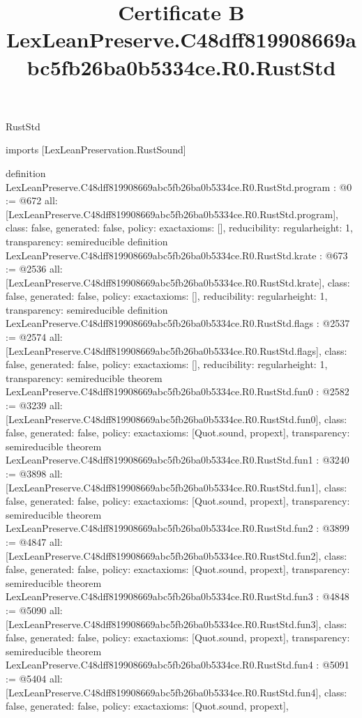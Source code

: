 \begin{lexlean}{RustStd}
\title{Certificate B LexLeanPreserve.C48dff819908669abc5fb26ba0b5334ce.R0.RustStd}
\begin{coremodule}
imports [LexLeanPreservation.RustSound]

definition LexLeanPreserve.C48dff819908669abc5fb26ba0b5334ce.R0.RustStd.program : @0 := @672 {
  all: [LexLeanPreserve.C48dff819908669abc5fb26ba0b5334ce.R0.RustStd.program],
  class: false,
  generated: false,
  policy: exact{axioms: []},
  reducibility: regular{height: 1},
  transparency: semireducible
}
definition LexLeanPreserve.C48dff819908669abc5fb26ba0b5334ce.R0.RustStd.krate : @673 := @2536 {
  all: [LexLeanPreserve.C48dff819908669abc5fb26ba0b5334ce.R0.RustStd.krate],
  class: false,
  generated: false,
  policy: exact{axioms: []},
  reducibility: regular{height: 1},
  transparency: semireducible
}
definition LexLeanPreserve.C48dff819908669abc5fb26ba0b5334ce.R0.RustStd.flags : @2537 := @2574 {
  all: [LexLeanPreserve.C48dff819908669abc5fb26ba0b5334ce.R0.RustStd.flags],
  class: false,
  generated: false,
  policy: exact{axioms: []},
  reducibility: regular{height: 1},
  transparency: semireducible
}
theorem LexLeanPreserve.C48dff819908669abc5fb26ba0b5334ce.R0.RustStd.fun0 : @2582 := @3239 {
  all: [LexLeanPreserve.C48dff819908669abc5fb26ba0b5334ce.R0.RustStd.fun0],
  class: false,
  generated: false,
  policy: exact{axioms: [Quot.sound, propext]},
  transparency: semireducible
}
theorem LexLeanPreserve.C48dff819908669abc5fb26ba0b5334ce.R0.RustStd.fun1 : @3240 := @3898 {
  all: [LexLeanPreserve.C48dff819908669abc5fb26ba0b5334ce.R0.RustStd.fun1],
  class: false,
  generated: false,
  policy: exact{axioms: [Quot.sound, propext]},
  transparency: semireducible
}
theorem LexLeanPreserve.C48dff819908669abc5fb26ba0b5334ce.R0.RustStd.fun2 : @3899 := @4847 {
  all: [LexLeanPreserve.C48dff819908669abc5fb26ba0b5334ce.R0.RustStd.fun2],
  class: false,
  generated: false,
  policy: exact{axioms: [Quot.sound, propext]},
  transparency: semireducible
}
theorem LexLeanPreserve.C48dff819908669abc5fb26ba0b5334ce.R0.RustStd.fun3 : @4848 := @5090 {
  all: [LexLeanPreserve.C48dff819908669abc5fb26ba0b5334ce.R0.RustStd.fun3],
  class: false,
  generated: false,
  policy: exact{axioms: [Quot.sound, propext]},
  transparency: semireducible
}
theorem LexLeanPreserve.C48dff819908669abc5fb26ba0b5334ce.R0.RustStd.fun4 : @5091 := @5404 {
  all: [LexLeanPreserve.C48dff819908669abc5fb26ba0b5334ce.R0.RustStd.fun4],
  class: false,
  generated: false,
  policy: exact{axioms: [Quot.sound, propext]},
}
\end{coremodule}
\end{lexlean}
